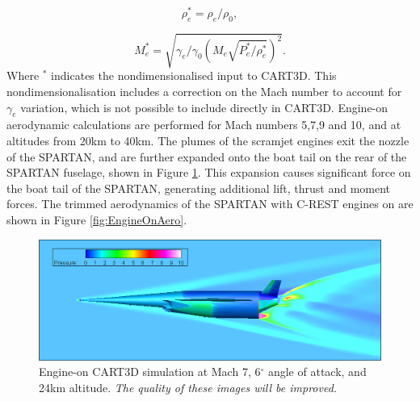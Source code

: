 		\begin{equation}
		\rho_e^* = \rho_e/\rho_0,
		\end{equation}
		
		\begin{equation}
		M_e^* = \sqrt{\gamma_e/\gamma_0 (M_e \sqrt{ P_e^*/\rho_e^*})^2}.
		\end{equation}
		Where $^*$ indicates the nondimensionalised input to CART3D. This nondimensionalisation includes a correction on the Mach number to account for $\gamma_e$ variation, which is not possible to include directly in CART3D\cite{Mehta2016}. Engine-on aerodynamic calculations are performed for Mach numbers 5,7,9 and 10, and at altitudes from 20km to 40km.
		The plumes of the scramjet engines exit the nozzle of the SPARTAN, and are further expanded onto the boat tail on the rear of the SPARTAN fuselage, shown in Figure \ref{fig:EngineOn-M7AoA624km}. This expansion causes significant force on the boat tail of the SPARTAN, generating additional lift, thrust and moment forces. The trimmed aerodynamics of the SPARTAN with C-REST engines on are shown in Figure \ref{fig:EngineOnAero}.
		
		
		\begin{figure}[ht]
			\centering
			\includegraphics[width=0.9\linewidth]{figures/3_vehicle_design/EngineOn-M7AoA024km}
			\caption{Engine-on CART3D simulation at Mach 7, 6$^\circ$ angle of attack, and 24km altitude. \textit{The quality of these images will be improved.}}
			\label{fig:EngineOn-M7AoA624km}
		\end{figure}
		
